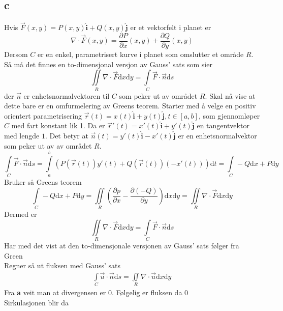 \documentclass[a4paper,10pt,norsk]{article}
\newcommand{\dd}[1]{\mathrm{d}#1}
\newcommand{\uvec}[1]{\boldsymbol{\hat{\textbf{#1}}}}
\begin{document}
	\subsection*{c}
	Hvis $\vec{F} (x,y) = P(x,y) \uvec{i} + Q(x,y) \uvec{j}$ er et vektorfelt i planet er \[
		\nabla \cdot \vec{F} (x,y) = \frac{\partial P}{\partial x} (x,y) + \frac{\partial Q}{\partial y} (x,y)
	\] 
		Dersom $C$ er en enkel, parametrisert kurve i planet som omslutter et område $R$.
		Så må det finnes en to-dimensjonal versjon av Gauss' sats som sier \[
		\iint\limits_R \nabla \cdot \vec{F}  \dd{x}\dd{y} = \int\limits_C \vec{F} \cdot \vec{n}  \dd{s}
		\] 
		der $\vec{n} $ er enhetsnormalvektoren til $C$ som peker ut av området $R$.
		Skal nå vise at dette bare er en omfurmelering av Greens teorem.
		Starter med å velge en positiv orientert parametrisering $\vec{r} (t) = x(t) \uvec{i} + y(t) \uvec{j}, t \in [a,b]$, som gjennomløper $C$ med fart konstant lik 1.
		Da er $\overrightarrow{r}'(t) = x'(t) \uvec{i} + y'(t) \uvec{j}$ en tangentvektor med lengde $1$.
		Det betyr at $\vec{n} (t) = y'(t) \uvec{i} - x'(t) \uvec{j}$ er en enhetsnormalvektor som peker ut av av området $R$.  \[
			\int\limits_C \vec{F} \cdot \vec{n} \dd{s}= \int\limits_a^b \left( P \left( \vec{r} (t) \right) y'(t) + Q \left( \vec{r} (t) \right) \left( -x'(t) \right)  \right) \dd{t}
			= \int\limits_C -Q \dd{x}+P \dd{y}
		\] 
		Bruker så Greens teorem \[
			\int\limits_C -Q \dd{x} + P \dd{y} = \iint\limits_R \left( \frac{\partial p}{\partial x} - \frac{\partial (-Q)}{\partial y}  \right) \dd{x}\dd{y}= \iint\limits_R \nabla \cdot \vec{F} \dd{x}\dd{y}
		\] 
		Dermed er \[
		\iint\limits_R \nabla \cdot \vec{F} \dd{x}\dd{y}= \int\limits_C \vec{F} \cdot \vec{n} \dd{s}
		\] 
		Har med det vist at den to-dimensjonale versjonen av Gauss' sats følger fra Green\\
		Regner så ut fluksen med Gauss' sats
		\begin{align*}
			\int\limits_C \vec{u}  \cdot \vec{n} \dd{s} = \iint \limits_R \nabla \cdot \vec{u} \dd{x}\dd{y}
		\end{align*}
		Fra \textbf{a} veit man at divergensen er $0$. Følgelig er fluksen da $0$\\
		Sirkulasjonen blir da
\end{document}
